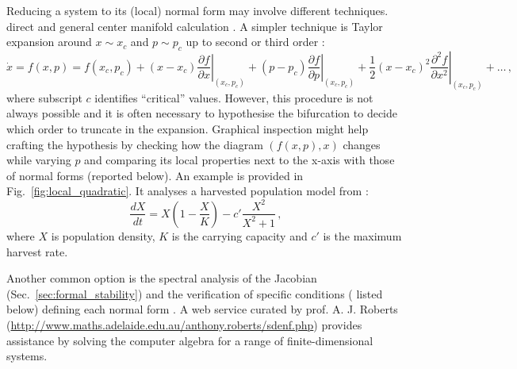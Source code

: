 Reducing a system to its (local) normal form may involve different techniques. direct and general center manifold calculation \citep{Guckenheimer2009a,Kuehn2021}. A simpler technique is Taylor expansion around $x \sim x_c$ and $p \sim p_c$ up to second or third order \citep{strogatz2018nonlinear}: 
\begin{equation}
	\dot{x} = f(x,p) = f(x_c, p_c) +(x-x_c) \left. \frac{\partial f}{\partial x} \right\rvert _{(x_c,p_c)} + (p-p_c)\left. \frac{\partial f}{\partial p} \right\rvert _{(x_c,p_c)} + \frac{1}{2} (x-x_c)^2 \left. \frac{\partial^2 f}{\partial x^2} \right\rvert _{(x_c,p_c)} + \dots \, , \label{eq:nf_derivation}
\end{equation}
where subscript $c$ identifies ``critical'' values. However, this procedure is not always possible and it is often necessary to hypothesise the bifurcation to decide which order to truncate in the expansion. Graphical inspection might help crafting the hypothesis by checking how the diagram $(f(x,p),x)$ changes while varying $p$ and comparing its local properties next to the x-axis with those of normal forms (reported below). An example is provided in Fig.~\ref{fig:local_quadratic}. It analyses a harvested population model from \textcite{Scheffer2009}:
\begin{equation}
	\frac{dX}{dt} = X\left(1-\frac{X}{K}\right) - c' \frac{X^2}{X^2+1} \, ,
	\label{eq:harv_pop1}
\end{equation}
where $X$ is population density, $K$ is the carrying capacity and $c'$ is the maximum harvest rate.

Another common option is the spectral analysis of the Jacobian (Sec.~\ref{sec:formal_stability}) and the verification of specific conditions ( listed below) defining each normal form \citep{strogatz2018nonlinear}. A web service curated by prof. A. J. Roberts (\url{http://www.maths.adelaide.edu.au/anthony.roberts/sdenf.php})  provides assistance by solving the computer algebra for a range of finite-dimensional systems. \\


